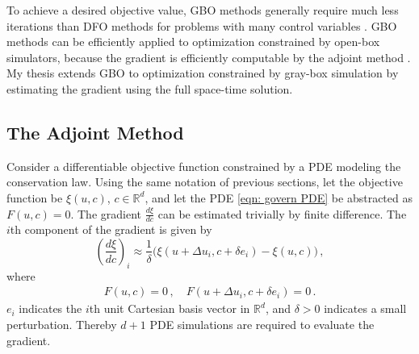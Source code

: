 \indent To achieve a desired objective value, 
GBO methods generally require much less iterations than DFO methods for problems with many 
control variables \cite{opt via sim review, nonlinear program}. GBO methods can be efficiently applied to 
optimization constrained by open-box simulators, because the gradient is efficiently computable by
the adjoint method \cite{adjoint, opt via sim review}.
My thesis extends GBO to optimization constrained by gray-box simulation by estimating 
the gradient using the full space-time solution.

\subsection{The Adjoint Method}
Consider a differentiable objective function constrained by a PDE modeling the conservation law.
Using the same notation of previous sections, 
let the objective function be $\xi(u,c)$, $c\in \mathbb{R}^d$, 
and let the PDE \eqref{eqn: govern PDE} be abstracted
as $F(u,c) = 0$. The gradient $\frac{d\xi}{dc}$ can be estimated trivially by finite difference. The
$i$th component of the gradient is given by
\begin{equation}
    \left(\frac{d\xi}{dc}\right)_i \approx \frac{1}{\delta} \big( 
    \xi(u+ \Delta u_i, c+\delta e_i) - \xi(u, c) \big)\,,
\end{equation}
where
\begin{equation}\begin{split}
    F(u,c)=0\,, \quad F(u+\Delta u_i, c+ \delta e_i) = 0\,.
\end{split}\end{equation}
$e_i$ indicates the $i$th unit Cartesian basis vector in $\mathbb{R}^d$, and $\delta>0$ indicates
a small perturbation. Thereby $d+1$ PDE simulations are required to evaluate the gradient.\\

